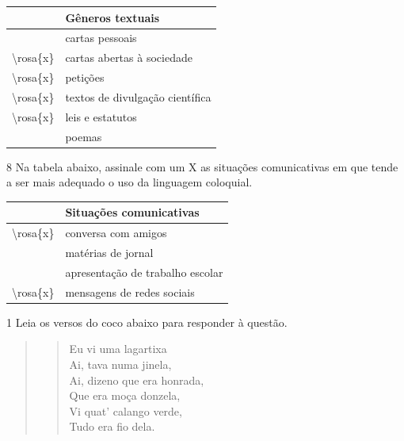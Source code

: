 \begin{table}[]
\begin{tabular}{l|l|}
\cline{2-2}
 & \textbf{Gêneros textuais} \\ \hline
\multicolumn{1}{|l|}{} & cartas pessoais \\ \hline
\multicolumn{1}{|l|}{\textbackslash{}rosa\{x\}} & cartas abertas à sociedade \\ \hline
\multicolumn{1}{|l|}{\textbackslash{}rosa\{x\}} & petições \\ \hline
\multicolumn{1}{|l|}{\textbackslash{}rosa\{x\}} & textos de divulgação científica \\ \hline
\multicolumn{1}{|l|}{\textbackslash{}rosa\{x\}} & leis e estatutos \\ \hline
\multicolumn{1}{|l|}{} & poemas \\ \hline
\end{tabular}
\end{table}

\num{8} Na tabela abaixo, assinale com um X as situações comunicativas em que tende a ser mais adequado
o uso da linguagem coloquial.

\begin{table}[]
\begin{tabular}{l|l|}
\cline{2-2}
 & \textbf{Situações comunicativas} \\ \hline
\multicolumn{1}{|l|}{\textbackslash{}rosa\{x\}} & conversa com amigos \\ \hline
\multicolumn{1}{|l|}{} & matérias de jornal \\ \hline
\multicolumn{1}{|l|}{} & apresentação de trabalho escolar \\ \hline
\multicolumn{1}{|l|}{\textbackslash{}rosa\{x\}} & mensagens de redes sociais \\ \hline
\end{tabular}
\end{table}


\num{1} Leia os versos do coco abaixo para responder à questão.

\begin{quote}
\begin{verse}

Eu vi uma lagartixa \\
Ai, tava numa jinela, \\
Ai, dizeno que era honrada, \\
Que era moça donzela, \\
Vi quat' calango verde, \\
Tudo era fio dela. 

\end{verse}
\end{quote}

